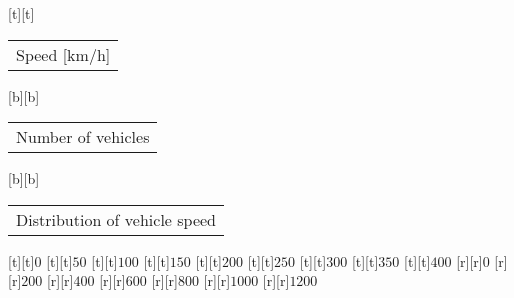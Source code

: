 %
%
[t][t]{\fontsize{8}{12}\selectfont \setlength{\tabcolsep}{0pt}\begin{tabular}{c}Speed [km/h]\end{tabular}}%
[b][b]{\fontsize{8}{12}\selectfont \setlength{\tabcolsep}{0pt}\begin{tabular}{c}Number of vehicles\end{tabular}}%
[b][b]{\fontsize{8}{12}\selectfont \setlength{\tabcolsep}{0pt}\begin{tabular}{c}Distribution of vehicle speed\end{tabular}}%
%
\fontsize{6}{12}%
\selectfont%
%
[t][t]{$0$}%
[t][t]{$50$}%
[t][t]{$100$}%
[t][t]{$150$}%
[t][t]{$200$}%
[t][t]{$250$}%
[t][t]{$300$}%
[t][t]{$350$}%
[t][t]{$400$}%
%
[r][r]{$0$}%
[r][r]{$200$}%
[r][r]{$400$}%
[r][r]{$600$}%
[r][r]{$800$}%
[r][r]{$1000$}%
[r][r]{$1200$}%
%
%
